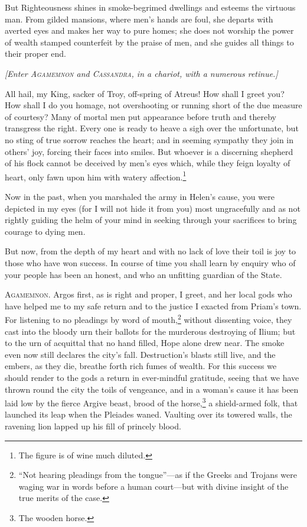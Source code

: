 \documentclass[12pt]{article}
\begin{document}
But Righteousness shines in smoke-begrimed dwellings and esteems the virtuous man. From gilded mansions, where men's hands are foul, she departs with averted eyes and makes her way to pure homes; she does not worship the power of wealth stamped counterfeit by the praise of men, and she guides all things to their proper end.

\begin{center}
\textit{[Enter \textsc{Agamemnon} and \textsc{Cassandra}, in a chariot, with a numerous retinue.]}
\end{center}

All hail, my King, sacker of Troy, off-spring of Atreus! How shall I greet you? How shall I do you homage, not overshooting or running short of the due measure of courtesy? Many of mortal men put appearance before truth and thereby transgress the right. Every one is ready to heave a sigh over the unfortunate, but no sting of true sorrow reaches the heart; and in seeming sympathy they join in others' joy, forcing their faces into smiles. But whoever is a discerning shepherd of his flock cannot be deceived by men's eyes which, while they feign loyalty of heart, only fawn upon him with watery affection.\footnote{The figure is of wine much diluted.}

Now in the past, when you marshaled the army in Helen's cause, you were depicted in my eyes (for I will not hide it from you) most ungracefully and as not rightly guiding the helm of your mind in seeking through your sacrifices to bring courage to dying men.

But now, from the depth of my heart and with no lack of love their toil is joy to those who have won success. In course of time you shall learn by enquiry who of your people has been an honest, and who an unfitting guardian of the State.

\textsc{Agamemnon.} Argos first, as is right and proper, I greet, and her local gods who have helped me to my safe return and to the justice I exacted from Priam's town. For listening to no pleadings by word of mouth,\footnote{\-``Not hearing pleadings from the tongue''---as if the Greeks and Trojans were waging war in words before a human court---but with divine insight of the true merits of the case.} without dissenting voice, they cast into the bloody urn their ballots for the murderous destroying of Ilium; but to the urn of acquittal that no hand filled, Hope alone drew near. The smoke even now still declares the city's fall. Destruction's blasts still live, and the embers, as they die, breathe forth rich fumes of wealth. For this success we should render to the gods a return in ever-mindful gratitude, seeing that we have thrown round the city the toils of vengeance, and in a woman's cause it has been laid low by the fierce Argive beast, brood of the horse,\footnote{The wooden horse.} a shield-armed folk, that launched its leap when the Pleiades waned. Vaulting over its towered walls, the ravening lion lapped up his fill of princely blood.
\end{document}

